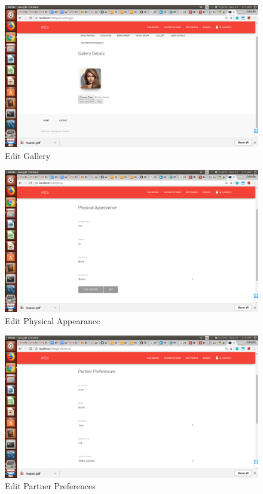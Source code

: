 \documentclass[12pt]{report}
\begin{document}
\begin{figure}[!htb]
    \centering
    \includegraphics[width=1\textwidth]{sc-6.png}
    \caption{Edit Gallery}
    \label{fig:Edit Gallery}
\end{figure}

\begin{figure}[!htb]
    \centering
    \includegraphics[width=1\textwidth]{sc-7.png}
    \caption{Edit Physical Appearance}
    \label{fig:Edit Physical Appearance}
\end{figure}

\begin{figure}[!htb]
    \centering
    \includegraphics[width=1\textwidth]{sc-8.png}
    \caption{Edit Partner Preferences}
    \label{fig:Edit Partner Preferences}
\end{figure}
\end{document}

